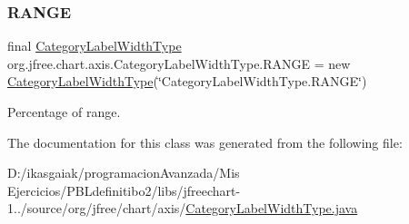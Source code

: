 \subsubsection{\texorpdfstring{R\+A\+N\+GE}{RANGE}}
{\footnotesize\ttfamily final \mbox{\hyperlink{classorg_1_1jfree_1_1chart_1_1axis_1_1_category_label_width_type}{Category\+Label\+Width\+Type}} org.\+jfree.\+chart.\+axis.\+Category\+Label\+Width\+Type.\+R\+A\+N\+GE = new \mbox{\hyperlink{classorg_1_1jfree_1_1chart_1_1axis_1_1_category_label_width_type}{Category\+Label\+Width\+Type}}(\char`\"{}Category\+Label\+Width\+Type.\+R\+A\+N\+GE\char`\"{})\hspace{0.3cm}{\ttfamily [static]}}

Percentage of range. 

The documentation for this class was generated from the following file\+:\begin{DoxyCompactItemize}
\item 
D\+:/ikasgaiak/programacion\+Avanzada/\+Mis Ejercicios/\+P\+B\+Ldefinitibo2/libs/jfreechart-\/1../source/org/jfree/chart/axis/\mbox{\hyperlink{_category_label_width_type_8java}{Category\+Label\+Width\+Type.\+java}}\end{DoxyCompactItemize}
